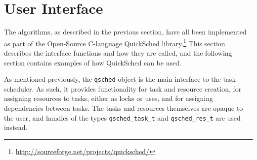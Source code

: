 \documentclass[preprint]{elsarticle}
\begin{document}




\appendix
\section{User Interface}

The algorithms, as described in the previous section, have
all been implemented as part of the Open-Source C-language
QuickSched library.\footnote{\url{http://sourceforge.net/projects/quicksched/}}
This section describes the interface functions and how they
are called, and the following section contains
examples of how QuickSched can be used.

As mentioned previously, the {\tt qsched} object is the main
interface to the task scheduler.
As such, it provides functionality for task and resource
creation, for assigning resources to tasks, either as locks
or uses, and for assigning dependencies between tasks.
The tasks and resources themselves are opaque to the
user, and handles of the types {\tt qsched\_task\_t}
and {\tt qsched\_res\_t} are used instead.
\end{document}
